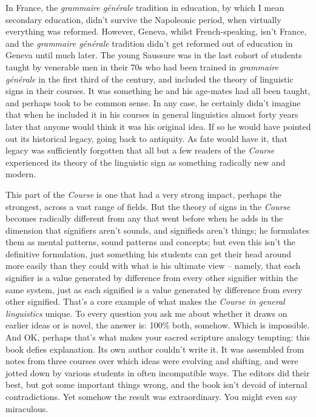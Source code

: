 \documentclass[output=paper]{langscibook}
\begin{document}
In France, the \textit{grammaire générale} tradition in education, by which I mean secondary education, didn’t survive the Napoleonic period, when virtually everything was reformed. However, Geneva, whilst French-speaking, isn’t France, and the \textit{grammaire générale} tradition didn’t get reformed out of education in Geneva until much later. The young Saussure was in the last cohort of students taught by venerable men in their 70s who had been trained in \textit{grammaire générale} in the first third of the century, and included the theory of linguistic signs in their courses. It was something he and his age-mates had all been taught, and perhaps took to be common sense. In any case, he certainly didn’t imagine that when he included it in his courses in general linguistics almost forty years later that anyone would think it was his original idea. If so he would have pointed out its historical legacy, going back to antiquity. As fate would have it, that legacy was sufficiently forgotten that all but a few readers of the \textit{Course} experienced its theory of the linguistic sign as something radically new and modern.

This part of the \textit{Course} is one that had a very strong impact, perhaps the strongest, across a vast range of fields. But the theory of signs in the \textit{Course} becomes radically different from any that went before when he adds in the dimension that signifiers aren’t sounds, and signifieds aren’t things; he formulates them as mental patterns, sound patterns and concepts; but even this isn’t the definitive formulation, just something his students can get their head around more easily than they could with what is his ultimate view – namely, that each signifier is a value generated by difference from every other signifier within the same system, just as each signified is a value generated by difference from every other signified. That’s a core example of what makes the \textit{Course in general linguistics} unique. To every question you ask me about whether it draws on earlier ideas or is novel, the answer is: 100\% both, somehow. Which is impossible. And OK, perhaps that’s what makes your sacred scripture analogy tempting: this book defies explanation. Its own author couldn’t write it. It was assembled from notes from three courses over which ideas were evolving and shifting, and were jotted down by various students in often incompatible ways. The editors did their best, but got some important things wrong, and the book isn’t devoid of internal contradictions. Yet somehow the result was extraordinary. You might even say miraculous.
\end{document}
